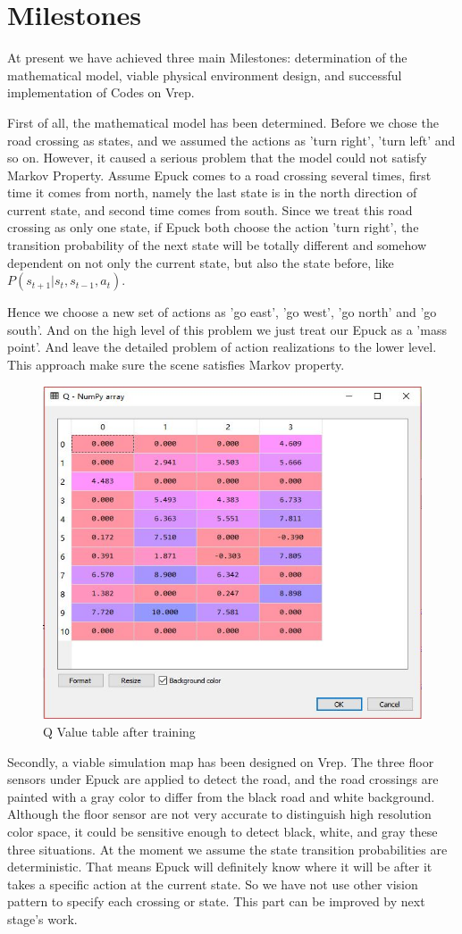 \documentclass[a4paper, 11pt]{article} %
\begin{document}
\section{Milestones}
At present we have achieved three main Milestones: determination of the mathematical model, viable physical environment design, and successful implementation of Codes on Vrep.

First of all, the mathematical model has been determined. Before we chose the road crossing as states, and we assumed the actions as 'turn right', 'turn left' and so on. However, it caused a serious problem that the model could not satisfy Markov Property. Assume Epuck comes to a road crossing several times, first time it comes from north, namely the last state is in the north direction of current state, and second time comes from south. Since we treat this road crossing as only one state, if Epuck both choose the action 'turn right', the transition probability of the next state will be totally different and somehow dependent on not only the current state, but also the state before, like $P(s_{t+1}|s_{t},s_{t-1},a_{t})$.

Hence we choose a new set of actions as 'go east', 'go west', 'go north' and 'go south'. And on the high level of this problem we just treat our Epuck as a 'mass point'. And leave the detailed problem of action realizations to the lower level. This approach make sure the scene satisfies Markov property. 
\begin{figure}[tb]
\centering 
\includegraphics[width=0.5\columnwidth]{Qvalue} 
\caption[An example of a floating figure]{Q Value table after training} %
\label{fig:Qvalue} 
\end{figure}

Secondly, a viable simulation map has been designed on Vrep. The three floor sensors under Epuck are applied to detect the road, and the road crossings are painted with a gray color to differ from the black road and white background. Although the floor sensor are not very accurate to distinguish high resolution color space, it could be sensitive enough to detect black, white, and gray these three situations. At the moment we assume the state transition probabilities are deterministic. That means Epuck will definitely know where it will be after it takes a specific action at the current state. So we have not use other vision pattern to specify each crossing or state. This part can be improved by next stage's work. 
\end{document}
